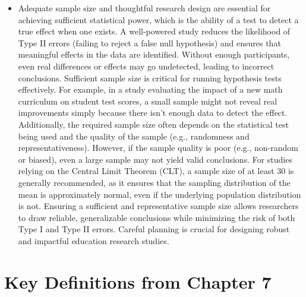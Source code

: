 \documentclass[
  letterpaper,
  DIV=11,
  numbers=noendperiod]{scrreprt}
\begin{document}
\begin{itemize}
  conclude that the observed results are unlikely to occur by chance.
  Using an alpha level ensures that decisions about the results are made
  consistently and with a pre-defined level of certainty. In education
  research, setting an alpha level helps researchers maintain fairness
  and reliability in their conclusions. For example, a researcher
  studying gender differences in science scores decides on an alpha
  level of α = 0.05 before running the test. This means they will only
  conclude there is a significant difference if the likelihood of the
  result occurring by random chance is less than 5\%. By following this
  rule, they ensure that their findings are based on solid evidence,
  reducing the risk of incorrectly identifying a difference that doesn't
  truly exist.
\item
  Adequate sample size and thoughtful research design are essential for
  achieving sufficient statistical power, which is the ability of a test
  to detect a true effect when one exists. A well-powered study reduces
  the likelihood of Type II errors (failing to reject a false null
  hypothesis) and ensures that meaningful effects in the data are
  identified. Without enough participants, even real differences or
  effects may go undetected, leading to incorrect conclusions.
  Sufficient sample size is critical for running hypothesis tests
  effectively. For example, in a study evaluating the impact of a new
  math curriculum on student test scores, a small sample might not
  reveal real improvements simply because there isn't enough data to
  detect the effect. Additionally, the required sample size often
  depends on the statistical test being used and the quality of the
  sample (e.g., randomness and representativeness). However, if the
  sample quality is poor (e.g., non-random or biased), even a large
  sample may not yield valid conclusions. For studies relying on the
  Central Limit Theorem (CLT), a sample size of at least 30 is generally
  recommended, as it ensures that the sampling distribution of the mean
  is approximately normal, even if the underlying population
  distribution is not. Ensuring a sufficient and representative sample
  size allows researchers to draw reliable, generalizable conclusions
  while minimizing the risk of both Type I and Type II errors. Careful
  planning is crucial for designing robust and impactful education
  research studies.
\end{itemize}

\section*{Key Definitions from Chapter
7}\label{key-definitions-from-chapter-7}
\end{document}
